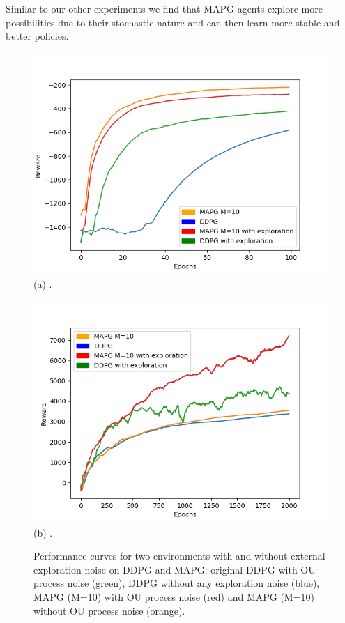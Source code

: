 Similar to our other experiments we find that MAPG agents explore more possibilities due to their stochastic nature and can then learn more stable and better policies. 


\begin{figure}[h]
    \centering
    \begin{minipage}[b]{.8\textwidth}
        \centering
        \includegraphics[width=.9\textwidth]{figures/pendulum_expl.png} \\
        (a) .
    \end{minipage}
    \quad
    \begin{minipage}[b]{.8\textwidth}
        \centering
        \includegraphics[width=.9\textwidth]{figures/halfcheetah_expl.png} \\
        (b) .
    \end{minipage}
    \caption{Performance curves for two environments with and without external exploration noise on DDPG and MAPG: original DDPG with OU process noise (green), DDPG without any exploration noise (blue), MAPG (M=10) with OU process noise (red) and MAPG (M=10) without OU process noise (orange).}
    \label{fig:exploration-hc}
\end{figure}


